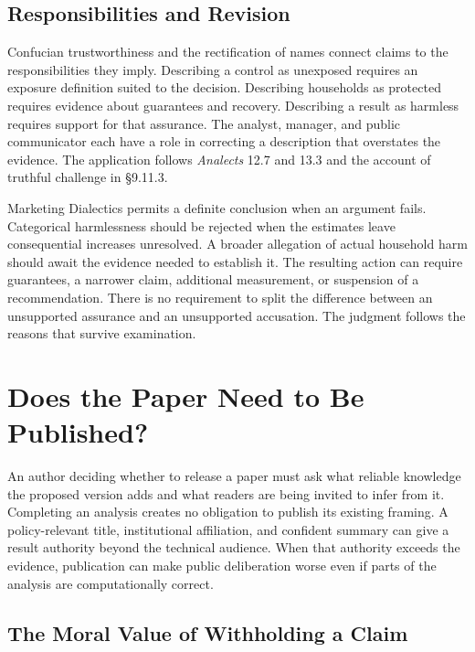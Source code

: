 \hypertarget{M09-responsibilities-and-revision}{%
\subsection{Responsibilities and
Revision}\label{M09-responsibilities-and-revision}}

\noindent \noindent Confucian trustworthiness and the rectification of names
connect claims to the responsibilities they imply. Describing a control
as unexposed requires an exposure definition suited to the decision.
Describing households as protected requires evidence about guarantees
and recovery. Describing a result as harmless requires support for that
assurance. The analyst, manager, and public communicator each have a
role in correcting a description that overstates the evidence. The
application follows \emph{Analects} 12.7 and 13.3 and the account of
truthful challenge in §9.11.3.

Marketing Dialectics permits a definite conclusion when an argument
fails. Categorical harmlessness should be rejected when the estimates
leave consequential increases unresolved. A broader allegation of actual
household harm should await the evidence needed to establish it. The
resulting action can require guarantees, a narrower claim, additional
measurement, or suspension of a recommendation. There is no requirement
to split the difference between an unsupported assurance and an
unsupported accusation. The judgment follows the reasons that survive
examination.


\hypertarget{M09-does-the-paper-need-to-be-published}{%
\section{Does the Paper Need to Be
Published?}\label{M09-does-the-paper-need-to-be-published}}

\noindent \noindent An author deciding whether to release a paper must ask what
reliable knowledge the proposed version adds and what readers are being
invited to infer from it. Completing an analysis creates no obligation
to publish its existing framing. A policy-relevant title, institutional
affiliation, and confident summary can give a result authority beyond
the technical audience. When that authority exceeds the evidence,
publication can make public deliberation worse even if parts of the
analysis are computationally correct.

\hypertarget{M09-the-moral-value-of-withholding-a-claim}{%
\subsection{The Moral Value of Withholding a
Claim}\label{M09-the-moral-value-of-withholding-a-claim}}

